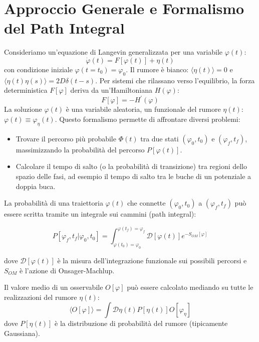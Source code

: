 \section{Approccio Generale e Formalismo del Path Integral}
Consideriamo un'equazione di Langevin generalizzata per una variabile $\varphi(t)$:
\begin{equation}
\dot{\varphi}(t)=F[\varphi(t)]+\eta(t)
\end{equation}
con condizione iniziale $\varphi(t=t_0)=\varphi_0$.
Il rumore è bianco: $\langle\eta(t)\rangle=0$ e $\langle\eta(t)\eta(s)\rangle=2D\delta(t-s)$.
Per sistemi che rilassano verso l'equilibrio, la forza deterministica $F[\varphi]$ deriva da un'Hamiltoniana $H(\varphi)$:
\begin{equation}
F[\varphi]=-H^{\prime}(\varphi)
\end{equation}
La soluzione $\varphi(t)$ è una variabile aleatoria, un funzionale del rumore $\eta(t)$: $\varphi(t) \equiv \varphi_{\eta}(t)$.
Questo formalismo permette di affrontare diversi problemi:
\begin{itemize}
    \item Trovare il percorso più probabile $\Phi(t)$ tra due stati $(\varphi_0, t_0)$ e $(\varphi_f, t_f)$, massimizzando la probabilità del percorso $P[\varphi(t)]$.
    \item Calcolare il tempo di salto (o la probabilità di transizione) tra regioni dello spazio delle fasi, ad esempio il tempo di salto tra le buche di un potenziale a doppia buca.
\end{itemize}
La probabilità di una traiettoria $\varphi(t)$ che connette $(\varphi_0, t_0)$ a $(\varphi_f, t_f)$ può essere scritta tramite un integrale sui cammini (path integral):

\begin{tcolorbox}[colback=colorA!5, colframe=colorA, arc=3mm, boxrule=1.2pt]
\begin{equation}
P[\varphi_f, t_f | \varphi_0, t_0] = \int_{\varphi(t_0)=\varphi_0}^{\varphi(t_f)=\varphi_f} \mathcal{D}[\varphi(t)] e^{-S_{OM}[\varphi]}
\end{equation}
\end{tcolorbox}

dove $\mathcal{D}[\varphi(t)]$ è la misura dell'integrazione funzionale sui possibili percorsi e $S_{OM}$ è l'azione di Onsager-Machlup.

\noindent Il valore medio di un osservabile $O[\varphi]$ può essere calcolato mediando su tutte le realizzazioni del rumore $\eta(t)$:
\begin{equation}
\langle O[\varphi] \rangle=\int \mathcal{D}\eta(t)P[\eta(t)]O[\varphi_{\eta}]
\end{equation}
dove $P[\eta(t)]$ è la distribuzione di probabilità del rumore (tipicamente Gaussiana).

